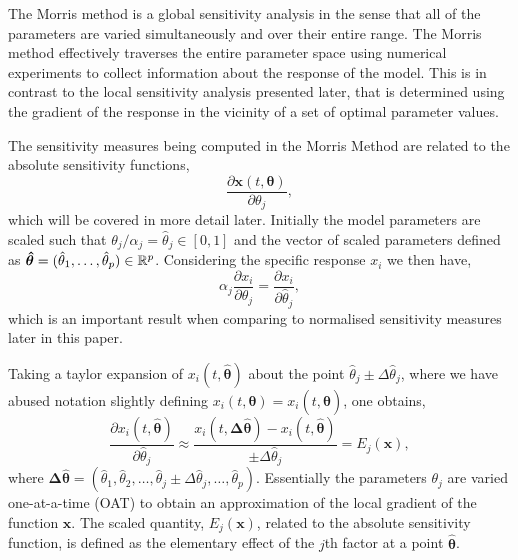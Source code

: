 \documentclass[a4paper, 12pt]{article}
\begin{document}
\smallskip

The Morris method is a global sensitivity analysis in the sense that all of the parameters are varied simultaneously and over their entire range. The Morris method effectively traverses the entire parameter space using numerical experiments to collect information about the response of the model. This is in contrast to the local sensitivity analysis presented later, that is determined using the gradient of the response in the vicinity of a set of optimal parameter values.

\smallskip

The sensitivity measures being computed in the Morris Method are related to the absolute sensitivity functions,
\begin{equation}
  \label{eq:asf}
  \frac{\partial \mathbf{x}(t,\boldsymbol{\theta})}{\partial \theta_j},
\end{equation}
which will be covered in more detail later. Initially the model parameters are scaled such that $\theta_j/\alpha_j=\hat{\theta}_j \in \left[0, 1 \right]$ and the vector of scaled parameters defined as $\boldsymbol{\hat{\theta}} = (\hat{\theta}_1,\ldots,\hat{\theta}_p)\in\mathbb{R}^p$. Considering the specific response $x_i$ we then have,
\begin{equation}
  \label{eq:asf-scale}
  \alpha_j\frac{\partial x_i}{\partial \theta_j}=\frac{\partial x_i}{\partial \hat{\theta}_j},
\end{equation}
which is an important result when comparing to normalised sensitivity measures later in this paper.

Taking a taylor expansion of $x_i(t,\boldsymbol{\hat{\theta}})$ about the point $\hat{\theta}_j\pm\Delta\hat{\theta}_j$, where we have abused notation slightly defining $x_i(t,\boldsymbol{\theta})=x_i(t,\boldsymbol{\hat{\theta}})$, one obtains,
\begin{equation}
  \label{eq:asf-expand}
  \frac{\partial x_i(t,\boldsymbol{\hat{\theta}})}{\partial \hat{\theta}_j}\approx\frac{x_i(t,\boldsymbol{\Delta\hat{\theta}})-x_i(t,\boldsymbol{\hat{\theta}})}{\pm\Delta\hat{\theta}_j}=E_j(\mathbf{x}),
\end{equation}
where $\boldsymbol{\Delta\hat{\theta}}=(\hat{\theta}_1,\hat{\theta}_2,\dots,\hat{\theta}_j\pm\Delta\hat{\theta}_j,\dots,\hat{\theta}_p)$. Essentially the parameters $\theta_j$ are varied one-at-a-time (OAT) to obtain an approximation of the local gradient of the function $\mathbf{x}$. The scaled quantity, $E_j(\mathbf{x})$, related to the absolute sensitivity function, is defined as the elementary effect of the $j$th factor at a point $\boldsymbol{\hat{\theta}}$.
\end{document}
